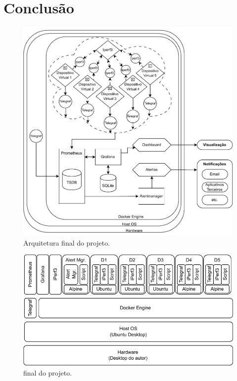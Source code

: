 \chapter{Conclusão}
\label{chap4}

\begin{figure}[H]
\centering
\color{red}
\setlength{\abovecaptionskip}{-20pt}
\includegraphics[width=\textwidth]{Imagens/chap04/final_diagram.pdf}
\caption{Arquitetura final do projeto.}
\label{fig:DiagramaFinal}
\end{figure}

\begin{figure}[H]
\centering
\color{red}
\setlength{\abovecaptionskip}{-20pt}
\includegraphics[width=\textwidth]{Imagens/chap04/final_stack.pdf}
\caption{ final do projeto.}
\label{fig:StackFinal}
\end{figure}

